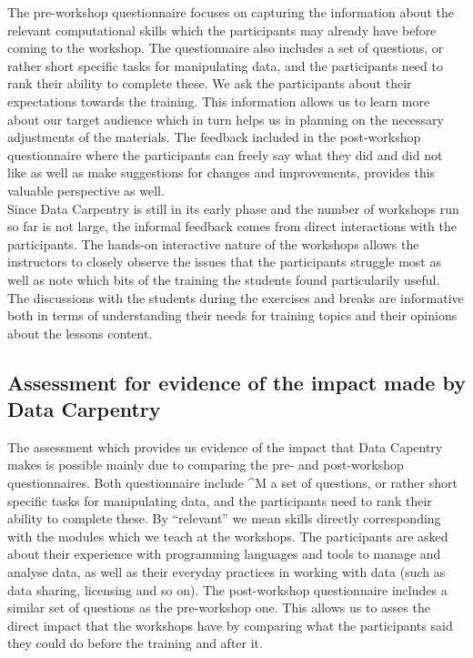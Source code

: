 \documentclass[15]{idcc}
\begin{document}
\begin{itemize}
The pre-workshop questionnaire focuses on capturing the information about the relevant computational skills which the participants may already
have before coming to the workshop. The questionnaire also includes
a set of questions, or rather short specific tasks for manipulating data, and the participants need to rank their ability to complete these.
We ask the participants about their expectations towards the training. This information allows us to learn more about our target audience which
in turn helps us in planning on the necessary adjustments of the materials. The feedback included in the post-workshop questionnaire
where the participants can freely say what they did and did not like as well as  make suggestions for changes and improvements, provides this
valuable perspective as well. \\

Since Data Carpentry is still in its early phase and the number of workshops run so far is not large, the informal feedback comes from direct interactions with the participants.
The hands-on interactive nature of the workshops allows the instructors to closely observe the issues that the participants struggle most as well as note which bits of the training the students
found particularily useful. The discussions with the students during the exercises and breaks are informative both in terms of understanding
their needs for training topics and their opinions about the lessons content.



\subsection{Assessment for evidence of the impact made by Data Carpentry}
The assessment which provides us evidence of the impact that Data Capentry makes is possible mainly due to comparing the pre- and post-workshop questionnaires.
 Both questionnaire include ^M a set of questions, or rather short specific tasks for manipulating data, and the participants need to rank their ability to complete these.
By ``relevant'' we mean skills directly corresponding with the modules which we teach at the workshops. The
participants are asked about their experience with programming languages and tools to manage and analyse data, as well as their everyday practices
in working with data (such as data sharing, licensing and so on). The post-workshop questionnaire includes a similar set of questions as the
pre-workshop one. This allows us to asses the direct impact that the workshops
have by comparing what the participants said they could do before the training and after it.


\end{itemize}
\end{document}
